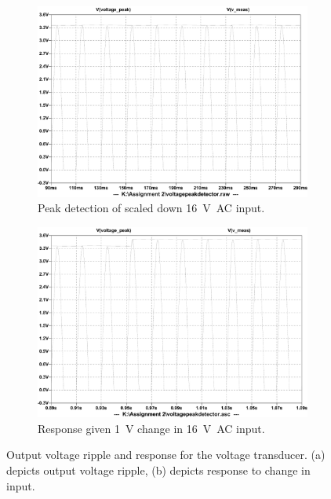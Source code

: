 \begin{figure}[h!]
 \centering
     \begin{subfigure}[]{0.45\textwidth}
        \centering
         \includegraphics[width=1\linewidth]{./Figures/voltagepeakdetectoroutputsim.pdf}
		    \caption{Peak detection of scaled down \SI{16}{\volt AC} input.} \label{subfig:16VACinputripple}
     \end{subfigure}
      \begin{subfigure}[]{0.45\textwidth}
              \centering
  		\includegraphics[width=1\linewidth]{./Figures/voltagepeakdetectoroutputchange.pdf}
		    \caption{Response given \SI{1}{\volt} change in \SI{16}{\volt AC} input.} \label{subfig:16VACinputchange}
     \end{subfigure}
   \caption[Simulated results for the voltage transducer]{Output voltage ripple and response for the voltage transducer. (a) depicts output voltage ripple, (b) depicts response to change in input. }
    \label{fig:voltage_simulation_results_box}
 \end{figure}

